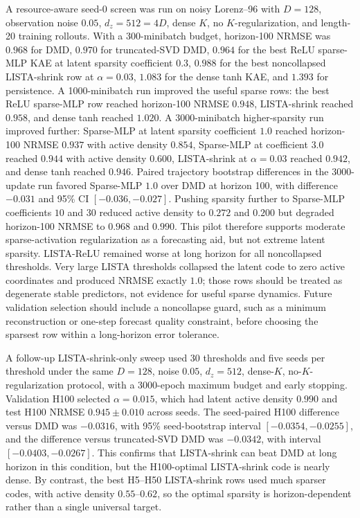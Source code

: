 A resource-aware seed-0 screen was run on noisy Lorenz--96 with \(D=128\), observation noise \(0.05\), \(d_z=512=4D\), dense \(K\), no \(K\)-regularization, and length-20 training rollouts. With a 300-minibatch budget, horizon-100 NRMSE was \(0.968\) for DMD, \(0.970\) for truncated-SVD DMD, \(0.964\) for the best ReLU sparse-MLP KAE at latent sparsity coefficient \(0.3\), \(0.988\) for the best noncollapsed LISTA-shrink row at \(\alpha=0.03\), \(1.083\) for the dense tanh KAE, and \(1.393\) for persistence. A 1000-minibatch run improved the useful sparse rows: the best ReLU sparse-MLP row reached horizon-100 NRMSE \(0.948\), LISTA-shrink reached \(0.958\), and dense tanh reached \(1.020\). A 3000-minibatch higher-sparsity run improved further: Sparse-MLP at latent sparsity coefficient \(1.0\) reached horizon-100 NRMSE \(0.937\) with active density \(0.854\), Sparse-MLP at coefficient \(3.0\) reached \(0.944\) with active density \(0.600\), LISTA-shrink at \(\alpha=0.03\) reached \(0.942\), and dense tanh reached \(0.946\). Paired trajectory bootstrap differences in the 3000-update run favored Sparse-MLP \(1.0\) over DMD at horizon 100, with difference \(-0.031\) and 95\% CI \([-0.036,-0.027]\). Pushing sparsity further to Sparse-MLP coefficients \(10\) and \(30\) reduced active density to \(0.272\) and \(0.200\) but degraded horizon-100 NRMSE to \(0.968\) and \(0.990\). This pilot therefore supports moderate sparse-activation regularization as a forecasting aid, but not extreme latent sparsity. LISTA-ReLU remained worse at long horizon for all noncollapsed thresholds. Very large LISTA thresholds collapsed the latent code to zero active coordinates and produced NRMSE exactly \(1.0\); those rows should be treated as degenerate stable predictors, not evidence for useful sparse dynamics. Future validation selection should include a noncollapse guard, such as a minimum reconstruction or one-step forecast quality constraint, before choosing the sparsest row within a long-horizon error tolerance.

A follow-up LISTA-shrink-only sweep used 30 thresholds and five seeds per threshold under the same \(D=128\), noise \(0.05\), \(d_z=512\), dense-\(K\), no-\(K\)-regularization protocol, with a 3000-epoch maximum budget and early stopping. Validation H100 selected \(\alpha=0.015\), which had latent active density \(0.990\) and test H100 NRMSE \(0.945\pm0.010\) across seeds. The seed-paired H100 difference versus DMD was \(-0.0316\), with 95\% seed-bootstrap interval \([-0.0354,-0.0255]\), and the difference versus truncated-SVD DMD was \(-0.0342\), with interval \([-0.0403,-0.0267]\). This confirms that LISTA-shrink can beat DMD at long horizon in this condition, but the H100-optimal LISTA-shrink code is nearly dense. By contrast, the best H5--H50 LISTA-shrink rows used much sparser codes, with active density \(0.55\)--\(0.62\), so the optimal sparsity is horizon-dependent rather than a single universal target.

